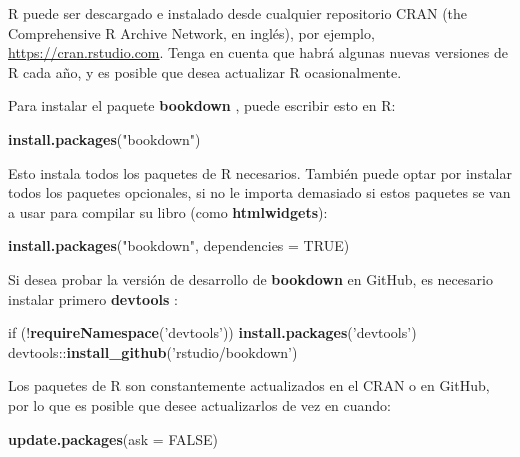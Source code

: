 \documentclass[12pt,]{krantz}
\makeatletter
\newenvironment{Shaded}{\begin{snugshade}}{\end{snugshade}}
\newcommand{\KeywordTok}[1]{\textcolor[rgb]{0.13,0.29,0.53}{\textbf{{#1}}}}
\newcommand{\DataTypeTok}[1]{\textcolor[rgb]{0.13,0.29,0.53}{{#1}}}
\newcommand{\StringTok}[1]{\textcolor[rgb]{0.31,0.60,0.02}{{#1}}}
\newcommand{\OtherTok}[1]{\textcolor[rgb]{0.56,0.35,0.01}{{#1}}}
\newcommand{\NormalTok}[1]{{#1}}
\newenvironment{kframe}{%
\medskip{}
\setlength{\fboxsep}{.8em}
 \def\at@end@of@kframe{}%
 \ifinner\ifhmode%
  \def\at@end@of@kframe{\end{minipage}}%
  \begin{minipage}{\columnwidth}%
 \fi\fi%
 \def\FrameCommand##1{\hskip\@totalleftmargin \hskip-\fboxsep
 \colorbox{shadecolor}{##1}\hskip-\fboxsep
     \hskip-\linewidth \hskip-\@totalleftmargin \hskip\columnwidth}%
 \MakeFramed {\advance\hsize-\width
   \@totalleftmargin\z@ \linewidth\hsize
   \@setminipage}}%
 {\par\unskip\endMakeFramed%
 \at@end@of@kframe}
\renewenvironment{Shaded}{\begin{kframe}}{\end{kframe}}
\theoremstyle{definition}
\theoremstyle{definition}
\theoremstyle{remark}
\makeatother
\begin{document}
R puede ser descargado e instalado desde cualquier repositorio CRAN (the
Comprehensive R Archive Network, en inglés), por ejemplo,
\url{https://cran.rstudio.com}. Tenga en cuenta que habrá algunas nuevas
versiones de R cada año, y es posible que desea actualizar R
ocasionalmente.

Para instalar el paquete \textbf{bookdown} , puede escribir esto en R:

\begin{Shaded}
\begin{Highlighting}[]
\KeywordTok{install.packages}\NormalTok{(}\StringTok{"bookdown"}\NormalTok{)}
\end{Highlighting}
\end{Shaded}

Esto instala todos los paquetes de R necesarios. También puede optar por
instalar todos los paquetes opcionales, si no le importa demasiado si
estos paquetes se van a usar para compilar su libro (como
\textbf{htmlwidgets}):

\begin{Shaded}
\begin{Highlighting}[]
\KeywordTok{install.packages}\NormalTok{(}\StringTok{"bookdown"}\NormalTok{, }\DataTypeTok{dependencies =} \OtherTok{TRUE}\NormalTok{)}
\end{Highlighting}
\end{Shaded}

Si desea probar la versión de desarrollo de \textbf{bookdown} en GitHub,
es necesario instalar primero \textbf{devtools} :

\begin{Shaded}
\begin{Highlighting}[]
\NormalTok{if (!}\KeywordTok{requireNamespace}\NormalTok{(}\StringTok{'devtools'}\NormalTok{)) }\KeywordTok{install.packages}\NormalTok{(}\StringTok{'devtools'}\NormalTok{)}
\NormalTok{devtools::}\KeywordTok{install_github}\NormalTok{(}\StringTok{'rstudio/bookdown'}\NormalTok{)}
\end{Highlighting}
\end{Shaded}

Los paquetes de R son constantemente actualizados en el CRAN o en
GitHub, por lo que es posible que desee actualizarlos de vez en cuando:

\begin{Shaded}
\begin{Highlighting}[]
\KeywordTok{update.packages}\NormalTok{(}\DataTypeTok{ask =} \OtherTok{FALSE}\NormalTok{)}
\end{Highlighting}
\end{Shaded}
\end{document}
